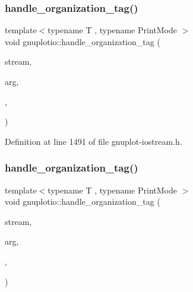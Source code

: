 \mbox{\label{namespacegnuplotio_a9d2cee7a7f2ed9748a0f135b206836d3}} 
\subsubsection{\texorpdfstring{handle\+\_\+organization\+\_\+tag()}{handle\_organization\_tag()}\hspace{0.1cm}{\footnotesize\ttfamily [4/5]}}
{\footnotesize\ttfamily template$<$typename T , typename Print\+Mode $>$ \\
void gnuplotio\+::handle\+\_\+organization\+\_\+tag (\begin{DoxyParamCaption}\item[{std\+::ostream \&}]{stream,  }\item[{const T \&}]{arg,  }\item[{\hyperlink{structgnuplotio_1_1_mode2_d_unwrap}{Mode2\+D\+Unwrap}}]{,  }\item[{Print\+Mode}]{ }\end{DoxyParamCaption})}



Definition at line 1491 of file gnuplot-\/iostream.\+h.

\mbox{\label{namespacegnuplotio_affc9cb6a9b6e5630523f0dbf8acdfcc2}} 
\subsubsection{\texorpdfstring{handle\+\_\+organization\+\_\+tag()}{handle\_organization\_tag()}\hspace{0.1cm}{\footnotesize\ttfamily [5/5]}}
{\footnotesize\ttfamily template$<$typename T , typename Print\+Mode $>$ \\
void gnuplotio\+::handle\+\_\+organization\+\_\+tag (\begin{DoxyParamCaption}\item[{std\+::ostream \&}]{stream,  }\item[{const T \&}]{arg,  }\item[{\hyperlink{structgnuplotio_1_1_mode_auto}{Mode\+Auto}}]{,  }\item[{Print\+Mode}]{ }\end{DoxyParamCaption})}



